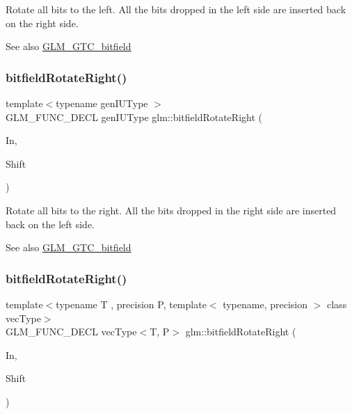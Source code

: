 Rotate all bits to the left. All the bits dropped in the left side are inserted back on the right side.

\begin{DoxySeeAlso}{See also}
\hyperlink{group__gtc__bitfield}{G\+L\+M\+\_\+\+G\+T\+C\+\_\+bitfield} 
\end{DoxySeeAlso}
\mbox{\label{group__gtc__bitfield_ga1c33d075c5fb8bd8dbfd5092bfc851ca}} 
\subsubsection{\texorpdfstring{bitfield\+Rotate\+Right()}{bitfieldRotateRight()}\hspace{0.1cm}{\footnotesize\ttfamily [1/2]}}
{\footnotesize\ttfamily template$<$typename gen\+I\+U\+Type $>$ \\
G\+L\+M\+\_\+\+F\+U\+N\+C\+\_\+\+D\+E\+CL gen\+I\+U\+Type glm\+::bitfield\+Rotate\+Right (\begin{DoxyParamCaption}\item[{gen\+I\+U\+Type}]{In,  }\item[{int}]{Shift }\end{DoxyParamCaption})}

Rotate all bits to the right. All the bits dropped in the right side are inserted back on the left side.

\begin{DoxySeeAlso}{See also}
\hyperlink{group__gtc__bitfield}{G\+L\+M\+\_\+\+G\+T\+C\+\_\+bitfield} 
\end{DoxySeeAlso}
\mbox{\label{group__gtc__bitfield_ga96b56fd2adad1eeaee9e10dfe83904ba}} 
\subsubsection{\texorpdfstring{bitfield\+Rotate\+Right()}{bitfieldRotateRight()}\hspace{0.1cm}{\footnotesize\ttfamily [2/2]}}
{\footnotesize\ttfamily template$<$typename T , precision P, template$<$ typename, precision $>$ class vec\+Type$>$ \\
G\+L\+M\+\_\+\+F\+U\+N\+C\+\_\+\+D\+E\+CL vec\+Type$<$T, P$>$ glm\+::bitfield\+Rotate\+Right (\begin{DoxyParamCaption}\item[{vec\+Type$<$ T, P $>$ const \&}]{In,  }\item[{int}]{Shift }\end{DoxyParamCaption})}


